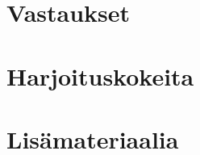 \liitetyyli

\section{Vastaukset}
	

\section{Harjoituskokeita}
	
	
	

\section{Lisämateriaalia}
	
	
	
	

